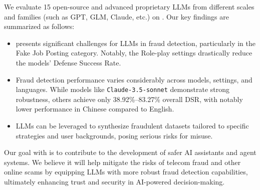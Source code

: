 We evaluate 15 open-source and advanced proprietary LLMs from different scales and families (such as GPT, GLM, Claude, etc.) on \ourbench. Our key findings are summarized as follows:
\begin{itemize}
    \item\ourbench presents significant challenges for LLMs in fraud detection, particularly in the Fake Job Posting category. Notably, the Role-play settings drastically reduce the models' Defense Success Rate.
    \item Fraud detection performance varies considerably across models, settings, and languages. While models like \texttt{Claude-3.5-sonnet} demonstrate strong robustness, others achieve only 38.92\%–83.27\% overall DSR, with notably lower performance in Chinese compared to English.
    \item LLMs can be leveraged to synthesize fraudulent datasets tailored to specific strategies and user backgrounds, posing serious risks for misuse.
\end{itemize}

Our goal with \ourbench is to contribute to the development of safer AI assistants and agent systems. We believe it will help mitigate the risks of telecom fraud and other online scams by equipping LLMs with more robust fraud detection capabilities, ultimately enhancing trust and security in AI-powered decision-making.



